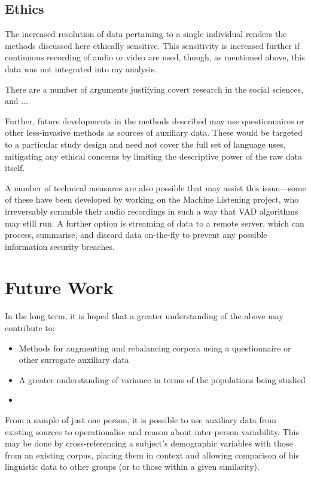\subsection{Ethics}
The increased resolution of data pertaining to a single individual renders the methods discussed here ethically sensitive.  This sensitivity is increased further if continuous recording of audio or video are used, though, as mentioned above, this data was not integrated into my analysis.

There are a number of arguments justifying covert research in the social sciences, and ...




Further, future developments in the methods described may use questionnaires or other less-invasive methods as sources of auxiliary data.  These would be targeted to a particular study design and need not cover the full set of language uses, mitigating any ethical concerns by limiting the descriptive power of the raw data itself.

A number of technical measures are also possible that may assist this issue---some of these have been developed by  working on the Machine Listening project, who irreversably scramble their audio recordings in such a way that VAD algorithms may still run.  A further option is streaming of data to a remote server, which can process, summarise, and discard data on-the-fly to prevent any possible information security breaches.








\section{Future Work}

In the long term, it is hoped that a greater understanding of the above may contribute to:

\begin{itemize}
    \item Methods for augmenting and rebalancing corpora using a questionnaire or other surrogate auxiliary data
    \item A greater understanding of variance in terms of the populations being studied
    \item 
\end{itemize}

From a sample of just one person, it is possible to use auxiliary data from existing sources to operationalise and reason about inter-person variability.  This may be done by cross-referencing a subject's demographic variables with those from an existing corpus, placing them in context and allowing comparison of his linguistic data to other groups (or to those within a given similarity).

